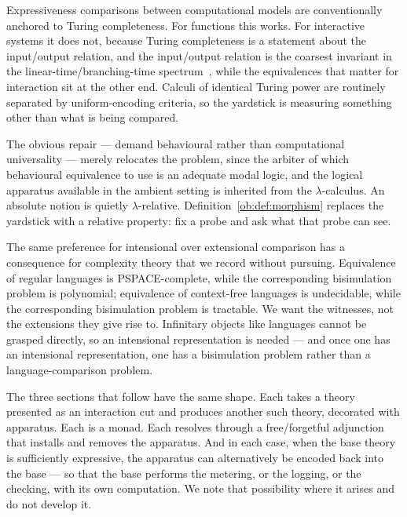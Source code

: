 \begin{remark}
Expressiveness comparisons between computational models are conventionally anchored to
Turing completeness. For functions this works. For interactive systems it does not,
because Turing completeness is a statement about the input/output relation, and the
input/output relation is the coarsest invariant in the linear-time/branching-time
spectrum~\cite{vanGlabbeek1990}, while the equivalences that matter for interaction sit
at the other end. Calculi of identical Turing power are routinely separated by
uniform-encoding criteria, so the yardstick is measuring something other than what is
being compared.

The obvious repair --- demand behavioural rather than computational universality ---
merely relocates the problem, since the arbiter of which behavioural equivalence to use
is an adequate modal logic, and the logical apparatus available in the ambient setting is
inherited from the $\lambda$-calculus. An absolute notion is quietly $\lambda$-relative.
Definition~\ref{ob:def:morphism} replaces the yardstick with a relative property: fix a
probe and ask what that probe can see.
\end{remark}

\begin{remark}
The same preference for intensional over extensional comparison has a consequence for
complexity theory that we record without pursuing. Equivalence of regular languages is
\textsc{PSPACE}-complete, while the corresponding bisimulation problem is polynomial;
equivalence of context-free languages is undecidable, while the corresponding
bisimulation problem is tractable. We want the witnesses, not the extensions they give
rise to. Infinitary objects like languages cannot be grasped directly, so an intensional
representation is needed --- and once one has an intensional representation, one has a
bisimulation problem rather than a language-comparison problem.
\end{remark}


The three sections that follow have the same shape. Each takes a theory presented as an
interaction cut and produces another such theory, decorated with apparatus. Each is a
monad. Each resolves through a free/forgetful adjunction that installs and removes the
apparatus. And in each case, when the base theory is sufficiently expressive, the
apparatus can alternatively be encoded back into the base --- so that the base performs
the metering, or the logging, or the checking, with its own computation. We note that
possibility where it arises and do not develop it.
